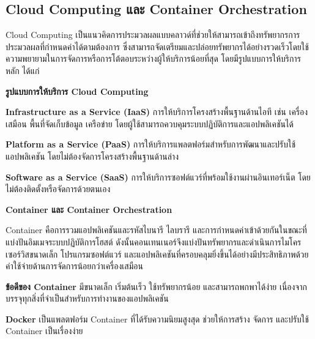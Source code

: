 \subsection{Cloud Computing และ Container Orchestration}

\hspace*{1.3em} %
Cloud Computing เป็นแนวคิดการประมวลผลแบบคลาวด์ที่ช่วยให้สามารถเข้าถึงทรัพยากรการประมวลผลที่กำหนดค่าได้ตามต้องการ ซึ่งสามารถจัดเตรียมและปล่อยทรัพยากรได้อย่างรวดเร็วโดยใช้ความพยายามในการจัดการหรือการโต้ตอบระหว่างผู้ให้บริการน้อยที่สุด โดยมีรูปแบบการให้บริการหลัก ได้แก่

\hspace*{1.3em} %
\textbf{รูปแบบการให้บริการ Cloud Computing}
\begin{mycustomitem}
    \item \textbf{Infrastructure as a Service (IaaS)} การให้บริการโครงสร้างพื้นฐานด้านไอที เช่น เครื่องเสมือน พื้นที่จัดเก็บข้อมูล เครือข่าย โดยผู้ใช้สามารถควบคุมระบบปฏิบัติการและแอปพลิเคชันได้
    \item \textbf{Platform as a Service (PaaS)} การให้บริการแพลตฟอร์มสำหรับการพัฒนาและปรับใช้แอปพลิเคชัน โดยไม่ต้องจัดการโครงสร้างพื้นฐานด้านล่าง
    \item \textbf{Software as a Service (SaaS)} การให้บริการซอฟต์แวร์ที่พร้อมใช้งานผ่านอินเทอร์เน็ต โดยไม่ต้องติดตั้งหรือจัดการด้วยตนเอง
\end{mycustomitem}

\hspace*{1.3em} %
\textbf{Container และ Container Orchestration}

\hspace*{1.3em} %
Container คือการรวมแอปพลิเคชันและรหัสไบนารี ไลบรารี และการกำหนดค่าเข้าด้วยกันในขณะที่แบ่งปันอิมเมจระบบปฏิบัติการโฮสต์ ดังนั้นคอนเทนเนอร์จึงแบ่งปันทรัพยากรและดำเนินการไมโครเซอร์วิสขนาดเล็ก โปรแกรมซอฟต์แวร์ และแอปพลิเคชันที่ครอบคลุมยิ่งขึ้นได้อย่างมีประสิทธิภาพด้วยค่าใช้จ่ายด้านการจัดการน้อยกว่าเครื่องเสมือน

\begin{mycustomitem}
    \item \textbf{ข้อดีของ Container} มีขนาดเล็ก เริ่มต้นเร็ว ใช้ทรัพยากรน้อย และสามารถพกพาได้ง่าย เนื่องจากบรรจุทุกสิ่งที่จำเป็นสำหรับการทำงานของแอปพลิเคชัน
    \item \textbf{Docker} เป็นแพลตฟอร์ม Container ที่ได้รับความนิยมสูงสุด ช่วยให้การสร้าง จัดการ และปรับใช้ Container เป็นเรื่องง่าย
\end{mycustomitem}

